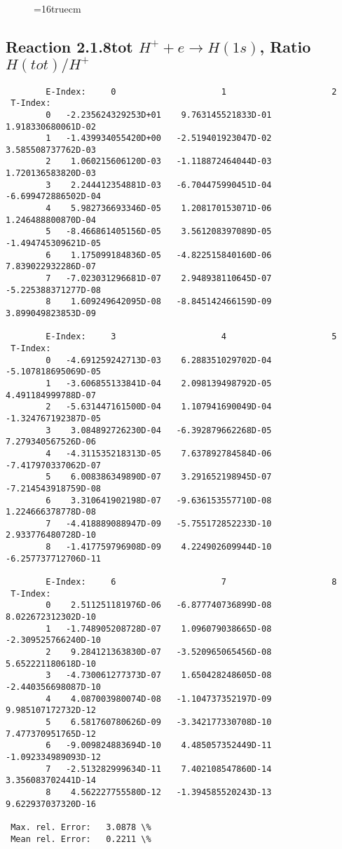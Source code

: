 \documentclass[12pt,dvipdfmx]{article}
\begin{document}
\begin{figure} \label{2.1.8re}
\epsfxsize=16truecm
\end{figure}
\newpage


\subsection{
Reaction 2.1.8tot  $H^+ + e \rightarrow H(1s) $, Ratio $H(tot)/H^+$
}

\begin{small}\begin{verbatim}
        E-Index:     0                     1                     2
 T-Index:
        0   -2.235624329253D+01    9.763145521833D-01    1.918330680061D-02
        1   -1.439934055420D+00   -2.519401923047D-02    3.585508737762D-03
        2    1.060215606120D-03   -1.118872464044D-03    1.720136583820D-03
        3    2.244412354881D-03   -6.704475990451D-04   -6.699472886502D-04
        4    5.982736693346D-05    1.208170153071D-06    1.246488800870D-04
        5   -8.466861405156D-05    3.561208397089D-05   -1.494745309621D-05
        6    1.175099184836D-05   -4.822515840160D-06    7.839022932286D-07
        7   -7.023031296681D-07    2.948938110645D-07   -5.225388371277D-08
        8    1.609249642095D-08   -8.845142466159D-09    3.899049823853D-09

        E-Index:     3                     4                     5
 T-Index:
        0   -4.691259242713D-03    6.288351029702D-04   -5.107818695069D-05
        1   -3.606855133841D-04    2.098139498792D-05    4.491184999788D-07
        2   -5.631447161500D-04    1.107941690049D-04   -1.324767192387D-05
        3    3.084892726230D-04   -6.392879662268D-05    7.279340567526D-06
        4   -4.311535218313D-05    7.637892784584D-06   -7.417970337062D-07
        5    6.008386349890D-07    3.291652198945D-07   -7.214543918759D-08
        6    3.310641902198D-07   -9.636153557710D-08    1.224666378778D-08
        7   -4.418889088947D-09   -5.755172852233D-10    2.933776480728D-10
        8   -1.417759796908D-09    4.224902609944D-10   -6.257737712706D-11

        E-Index:     6                     7                     8
 T-Index:
        0    2.511251181976D-06   -6.877740736899D-08    8.022672312302D-10
        1   -1.748905208728D-07    1.096079038665D-08   -2.309525766240D-10
        2    9.284121363830D-07   -3.520965065456D-08    5.652221180618D-10
        3   -4.730061277373D-07    1.650428248605D-08   -2.440356698087D-10
        4    4.087003980074D-08   -1.104737352197D-09    9.985107172732D-12
        5    6.581760780626D-09   -3.342177330708D-10    7.477370951765D-12
        6   -9.009824883694D-10    4.485057352449D-11   -1.092334989093D-12
        7   -2.513282999634D-11    7.402108547860D-14    3.356083702441D-14
        8    4.562227755580D-12   -1.394585520243D-13    9.622937037320D-16

 Max. rel. Error:   3.0878 \%
 Mean rel. Error:   0.2211 \%

\end{verbatim}\end{small}
\end{document}
